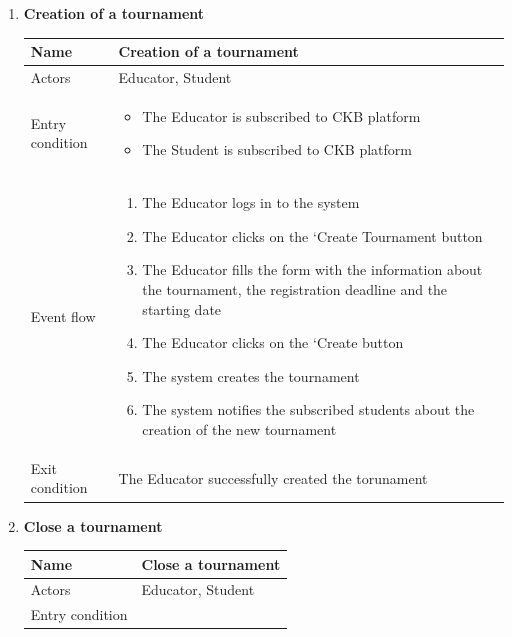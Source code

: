 \begin{enumerate}[label=UC\arabic*:]
\begin{tabular}{|p{3cm}|p{8cm}|}
\begin{itemize}
        \end{itemize}
        \\
        \hline
    \end{tabular}
    \item \textbf{Creation of a tournament} \\
    \begin{tabular}{|p{3cm}|p{8cm}|}
        \hline
        Name & Creation of a tournament \\
        \hline
        Actors & Educator, Student \\
        \hline
        Entry condition &
        \begin{itemize}
            \item The Educator is subscribed to CKB platform
            \item The Student is subscribed to CKB platform
        \end{itemize}
        \\
        \hline
        Event flow & 
        \begin{enumerate}[label=\arabic*.]
            \item The Educator logs in to the system
            \item The Educator clicks on the `Create Tournament button
            \item The Educator fills the form with the information about the tournament, the registration deadline and the starting date
            \item The Educator clicks on the `Create button
            \item The system creates the tournament
            \item The system notifies the subscribed students about the creation of the new tournament
        \end{enumerate}
        \\
        \hline
        Exit condition & The Educator successfully created the torunament \\
        \hline
    \end{tabular}
    \item \textbf{Close a tournament} \\
    \begin{tabular}{|p{3cm}|p{8cm}|}
    \hline
    Name & Close a tournament \\
    \hline
    Actors & Educator, Student \\
    \hline
    Entry condition &
    \begin{itemize}

\end{itemize}
\end{tabular}
\end{enumerate}
